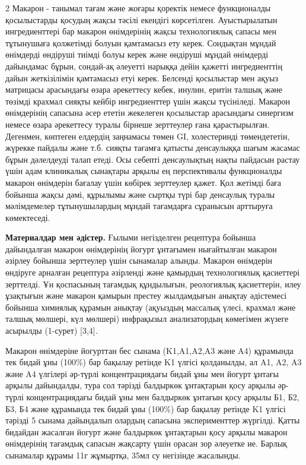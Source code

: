 \begin{multicols}{2}
Макарон - танымал тағам және жоғары қоректік немесе функционалды
қосылыстарды қосудың жақсы тәсілі екендігі көрсетілген. Ауыстырылатын
ингредиенттері бар макарон өнімдерінің жақсы технологиялық сапасы мен
тұтынушыға қолжетімді болуын қамтамасыз ету керек. Сондықтан мұндай
өнімдерді өндіруші тиімді болуы керек және өндіруші мұндай өнімдерді
дайындамас бұрын, сондай-ақ әлеуетті нарыққа дейін қажетті ингредиенттің
дайын жеткізілімін қамтамасыз етуі керек. Белсенді қосылыстар мен ақуыз
матрицасы арасындағы өзара әрекеттесу кебек, инулин, еритін талшық және
төзімді крахмал сияқты кейбір ингредиенттер үшін жақсы түсініледі.
Макарон өнімдерінің сапасына әсер ететін жекелеген қосылыстар арасындағы
синергизм немесе өзара әрекеттесу туралы бірнеше зерттеулер ғана
қарастырылған. Дегенмен, көптеген елдердің заңнамасы төмен GI,
холестеринді төмендететін, жүрекке пайдалы және т.б. сияқты тағамға
қатысты денсаулыққа шағым жасамас бұрын дәлелдеуді талап етеді. Осы
себепті денсаулықтың нақты пайдасын растау үшін адам клиникалық
сынақтары арқылы ең перспективалы функционалды макарон өнімдерін бағалау
үшін көбірек зерттеулер қажет. Қол жетімді баға бойынша жақсы дәмі,
құрылымы және сыртқы түрі бар денсаулық туралы мәлімдемелер
тұтынушылардың мұндай тағамдарға сұранысын арттыруға көмектеседі.

{\bfseries Материалдар мен әдістер.} Ғылыми негізделген рецептура бойынша
дайындалған макарон өнімдерінің йогурт ұнтағымен нығайтылған макарон
әзірлеу бойынша зерттеулер үшін сынамалар алынды. Макарон өнімдерін
өндіруге арналған рецептура әзірленді және қамырдың технологиялық
қасиеттері зерттелді. Ұн қоспасының тағамдық құндылығын, реологиялық
қасиеттерін, илеу ұзақтығын және макарон қамырын престеу жылдамдығын
анықтау әдістемесі бойынша химиялық құрамын анықтау (ақуыздың массалық
үлесі, крахмал және талшық мөлшері, күл мөлшері) инфрақызыл
анализатордың көмегімен жүзеге асырылды (1-сурет) {[}3,4{]}\emph{.}

Макарон өнімдеріне йогурттан бес сынама (K1,A1,A2,A3 және A4) құрамында
тек бидай ұны (100\%) бар бақылау ретінде K1 үлгісі қолданылды, ал A1,
A2, A3 және A4 үлгілері әр-түрлі концентрациядағы бидай ұны мен йогурт
ұнтағы арқылы дайындалды, тура сол тәрізді балдыркөк ұнтақтарын қосу
арқылы әр-түрлі концентрациядағы бидай ұны мен балдыркөк ұнтағын қосу
арқылы Б1, Б2, Б3, Б4 және құрамында тек бидай ұны (100\%) бар бақылау
ретінде K1 үлгісі тәрізді 5 сынама дайындалып олардың сапасына
эксперименттер жүргілді. Қатты бидайдан жасалған йогурт және балдыркөк
ұнтақтарын қосу арқылы макарон өнімдерінің тағамдық сапасын жақсарту
үшін орасан зор әлеуетке ие. Барлық сынамалар құрамы 11г жұмыртқа, 35мл
су негізінде жасалынды.


\end{multicols}
